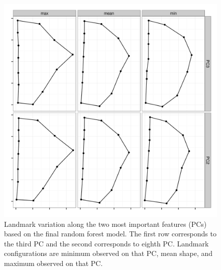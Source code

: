 \documentclass[12pt,letterpaper]{article}\usepackage{graphicx, color}
\begin{document}
\begin{figure}[ht]
  \centering
  \includegraphics[width = \textwidth]{figure/imp_var}
  \caption{Landmark variation along the two most important features (PCs) based on the final random forest model. The first row corresponds to the third PC and the second corresponds to eighth PC. Landmark configurations are minimum observed on that PC, mean shape, and maximum observed on that PC.}
  \label{fig:imp_var}
\end{figure}
\end{document}
